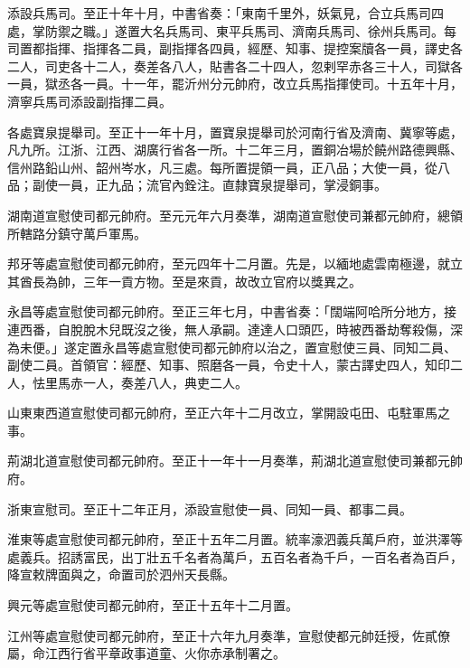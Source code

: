 \begin{pinyinscope}
 添設兵馬司。至正十年十月，中書省奏：「東南千里外，妖氣見，合立兵馬司四處，掌防禦之職。」遂置大名兵馬司、東平兵馬司、濟南兵馬司、徐州兵馬司。每司置都指揮、指揮各二員，副指揮各四員，經歷、知事、提控案牘各一員，譯史各二人，司吏各十二人，奏差各八人，貼書各二十四人，忽剌罕赤各三十人，司獄各一員，獄丞各一員。十一年，罷沂州分元帥府，改立兵馬指揮使司。十五年十月，濟寧兵馬司添設副指揮二員。



 各處寶泉提舉司。至正十一年十月，置寶泉提舉司於河南行省及濟南、冀寧等處，凡九所。江浙、江西、湖廣行省各一所。十二年三月，置銅冶場於饒州路德興縣、信州路鉛山州、韶州岑水，凡三處。每所置提領一員，正八品；大使一員，從八品；副使一員，正九品；流官內銓注。直隸寶泉提舉司，掌浸銅事。



 湖南道宣慰使司都元帥府。至元元年六月奏準，湖南道宣慰使司兼都元帥府，總領所轄路分鎮守萬戶軍馬。



 邦牙等處宣慰使司都元帥府，至元四年十二月置。先是，以緬地處雲南極邊，就立其酋長為帥，三年一貢方物。至是來貢，故改立官府以獎異之。



 永昌等處宣慰使司都元帥府。至正三年七月，中書省奏：「闊端阿哈所分地方，接連西番，自脫脫木兒既沒之後，無人承嗣。達達人口頭匹，時被西番劫奪殺傷，深為未便。」遂定置永昌等處宣慰使司都元帥府以治之，置宣慰使三員、同知二員、副使二員。首領官：經歷、知事、照磨各一員，令史十人，蒙古譯史四人，知印二人，怯里馬赤一人，奏差八人，典吏二人。



 山東東西道宣慰使司都元帥府，至正六年十二月改立，掌開設屯田、屯駐軍馬之事。



 荊湖北道宣慰使司都元帥府。至正十一年十一月奏準，荊湖北道宣慰使司兼都元帥府。



 浙東宣慰司。至正十二年正月，添設宣慰使一員、同知一員、都事二員。



 淮東等處宣慰使司都元帥府，至正十五年二月置。統率濠泗義兵萬戶府，並洪澤等處義兵。招誘富民，出丁壯五千名者為萬戶，五百名者為千戶，一百名者為百戶，降宣敕牌面與之，命置司於泗州天長縣。



 興元等處宣慰使司都元帥府，至正十五年十二月置。



 江州等處宣慰使司都元帥府，至正十六年九月奏準，宣慰使都元帥廷授，佐貳僚屬，命江西行省平章政事道童、火你赤承制署之。




\end{pinyinscope}
